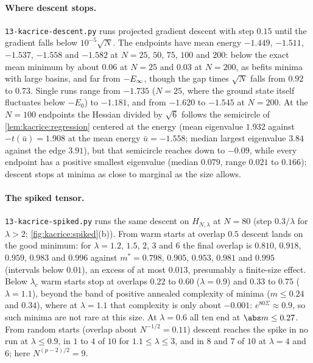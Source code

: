 \begin{refsection}
\paragraph{Where descent stops.} \texttt{13-kacrice-descent.py} runs projected gradient descent with step $0.15$ until the gradient falls below $10^{-5}\sqrt N$. The endpoints have mean energy $-1.449$, $-1.511$, $-1.537$, $-1.558$ and $-1.582$ at $N=25$, $50$, $75$, $100$ and $200$: below the exact mean minimum by about $0.06$ at $N=25$ and $0.03$ at $N=200$, as befits minima with large basins, and far from $-E_\infty$, though the gap times $\sqrt N$ falls from $0.92$ to $0.73$. Single runs range from $-1.735$ ($N=25$, where the ground state itself fluctuates below $-E_0$) to $-1.181$, and from $-1.620$ to $-1.545$ at $N=200$. At the $N=100$ endpoints the Hessian divided by $\sqrt6$ follows the semicircle of \cref{lem:kacrice:regression} centered at the energy (mean eigenvalue $1.932$ against $-t(\bar u)=1.908$ at the mean energy $\bar u=-1.558$; median largest eigenvalue $3.84$ against the edge $3.91$), but that semicircle reaches down to $-0.09$, while every endpoint has a positive smallest eigenvalue (median $0.079$, range $0.021$ to $0.166$): descent stops at minima as close to marginal as the size allows.

\paragraph{The spiked tensor.} \texttt{13-kacrice-spiked.py} runs the same descent on $H_{N,\lambda}$ at $N=80$ (step $0.3/\lambda$ for $\lambda>2$; \cref{fig:kacrice:spiked}(b)). From warm starts at overlap $0.5$ descent lands on the good minimum: for $\lambda=1.2$, $1.5$, $2$, $3$ and $6$ the final overlap is $0.810$, $0.918$, $0.959$, $0.983$ and $0.996$ against $m^*=0.798$, $0.905$, $0.953$, $0.981$ and $0.995$ (intervals below $0.01$), an excess of at most $0.013$, presumably a finite-size effect. Below $\lambda_c$ warm starts stop at overlaps $0.22$ to $0.60$ ($\lambda=0.9$) and $0.33$ to $0.75$ ($\lambda=1.1$), beyond the band of positive annealed complexity of minima ($m\le0.24$ and $0.34$), where at $\lambda=1.1$ that complexity is only about $-0.001$: $e^{80\Sigma}\approx0.9$, so such minima are not rare at this size. At $\lambda=0.6$ all ten end at $\abs m\le0.27$. From random starts (overlap about $N^{-1/2}=0.11$) descent reaches the spike in no run at $\lambda\le0.9$, in $1$ to $4$ of $10$ for $1.1\le\lambda\le3$, and in $8$ and $7$ of $10$ at $\lambda=4$ and $6$; here $N^{(p-2)/2}=9$.


\end{refsection}
